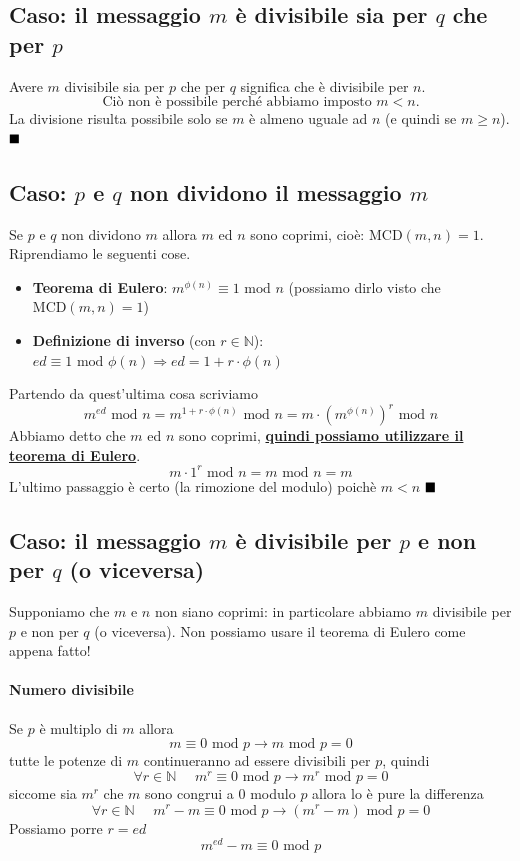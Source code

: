 \subsection{Caso: il messaggio $m$ è divisibile sia per $q$ che per $p$}
Avere $m$ divisibile sia per $p$ che per $q$ significa che è divisibile per $n$. 
\[\boxed{\text{Ciò non è possibile perché abbiamo imposto $m < n$.}}\]
La divisione risulta possibile solo se $m$ è almeno uguale ad $n$ (e quindi se $m \geq n$).
$\hfill\blacksquare$

\subsection{Caso: $p$ e $q$ non dividono il messaggio $m$}
Se $p$ e $q$ non dividono $m$ allora $m$ ed $n$ sono coprimi, cioè: $\text{MCD}(m,n)=1$. Riprendiamo le seguenti cose.
\begin{itemize}
	\item \textbf{Teorema di Eulero}: $m^{\phi(n)} \equiv 1 \text{ mod }n$ (possiamo dirlo visto che $\text{MCD}(m,n)=1$)
	\item \textbf{Definizione di inverso} (con $r \in \mathbb{N}$): $ed \equiv 1 \text{ mod } \phi(n) \Longrightarrow ed=1+r \cdot \phi(n)$
\end{itemize}
Partendo da quest'ultima cosa scriviamo
$$ m^{ed} \text{ mod } n = m^{1 + r \cdot \phi(n)} \text{ mod } n = m \cdot (m^{\phi(n)})^{r} \text{ mod } n$$
Abbiamo detto che $m$ ed $n$ sono coprimi, \textbf{\underline{quindi possiamo utilizzare il teorema di Eulero}}. 
$$ m \cdot 1^r \text{ mod } n = m \text{ mod } n = m $$
L'ultimo passaggio è certo (la rimozione del modulo) poichè $m <n$
$\hfill\blacksquare$
\subsection{Caso: il messaggio $m$ è divisibile per $p$ e non per $q$ (o viceversa)}
Supponiamo che $m$ e $n$ non siano coprimi: in particolare abbiamo $m$ divisibile per $p$ e non per $q$ (o viceversa). Non possiamo usare il teorema di Eulero come appena fatto! 
\paragraph{Numero  divisibile }Se $p$ è multiplo di $m$ allora
$$m \equiv 0 \text{ mod }p \longrightarrow m \text{ mod }p=0$$
tutte le potenze di $m$ continueranno ad essere divisibili per $p$, quindi
$$\forall r \in \mathbb{N}\,\,\,\,\, \,\,\,m^r\equiv 0 \text{ mod }p \longrightarrow m^r  \text{ mod } p=0$$
siccome sia $m^r$ che $m$ sono congrui a $0$ modulo $p$ allora lo è pure la differenza
$$\forall r \in \mathbb{N}\,\,\,\,\,\,\,\,m^r-m\equiv 0 \text{ mod } p \longrightarrow (m^r-m) \text{ mod } p = 0$$
Possiamo porre $r=ed$
$$m^{ed}-m\equiv 0 \text{ mod } p$$
